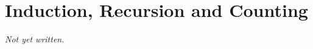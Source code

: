 \chapter{Induction, Recursion and Counting}\label{ch:induction-recursion-counting}


\textit{Not yet written.}
